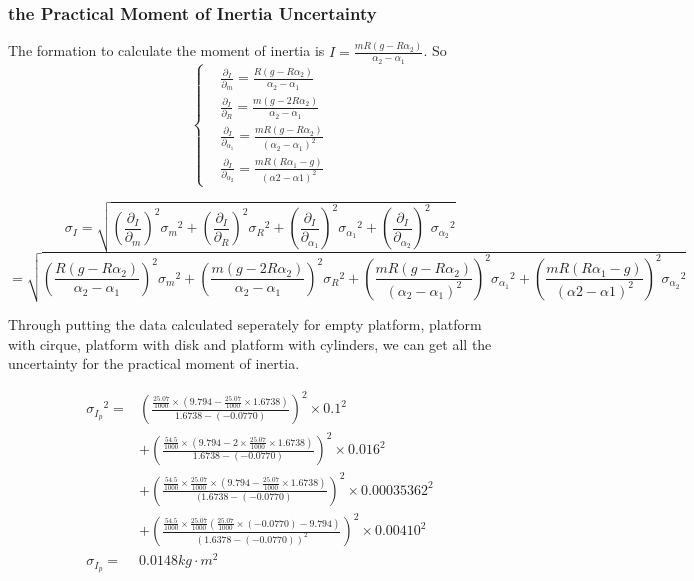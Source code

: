 \documentclass[12pt,a4paper]{article}
\begin{document}
\subsubsection{the Practical Moment of Inertia Uncertainty}
The formation to calculate the moment of inertia is $I=\frac{mR(g-R\alpha_2)}{\alpha_2-\alpha_1}$. So 
$$
\left\{
\begin{aligned}
    &\frac{\partial_I}{\partial_m}=\frac{R(g-R\alpha_2)}{\alpha_2-\alpha_1}\\
    &\frac{\partial_I}{\partial_R}=\frac{m(g-2R\alpha_2)}{\alpha_2-\alpha_1}\\
    &\frac{\partial_I}{\partial_{\alpha_1}}=\frac{mR(g-R\alpha_2)}{(\alpha_2-\alpha_1)^2}\\
    &\frac{\partial_I}{\partial_{\alpha_2}}=\frac{mR(R\alpha_1-g)}{(\alpha2-\alpha1)^2}
\end{aligned}
\right.
$$

$$\sigma_I=\sqrt{(\frac{\partial_I}{\partial_m})^2{\sigma_m}^2+(\frac{\partial_I}{\partial_R})^2{\sigma_R}^2+(\frac{\partial_I}{\partial_{\alpha_1}})^2{\sigma_{\alpha_1}}^2+(\frac{\partial_I}{\partial_{\alpha_2}})^2{\sigma_{\alpha_2}}^2}$$
$$=\sqrt{(\frac{R(g-R\alpha_2)}{\alpha_2-\alpha_1})^2{\sigma_m}^2+(\frac{m(g-2R\alpha_2)}{\alpha_2-\alpha_1})^2{\sigma_R}^2+(\frac{mR(g-R\alpha_2)}{(\alpha_2-\alpha_1)^2})^2{\sigma_{\alpha_1}}^2+(\frac{mR(R\alpha_1-g)}{(\alpha2-\alpha1)^2})^2{\sigma_{\alpha_2}}^2}$$

Through putting the data calculated seperately for empty platform, platform with cirque, platform with disk and platform with cylinders, we can get all the uncertainty for the practical moment of inertia.

$$
\begin{aligned}
{\sigma_{I_p}}^2=&(\frac{\frac{25.07}{1000}\times(9.794-\frac{25.07}{1000}\times 1.6738)}{1.6738-(-0.0770)})^2\times{0.1}^2\\
&+(\frac{\frac{54.5}{1000}\times(9.794-2\times \frac{25.07}{1000}\times 1.6738)}{1.6738-(-0.0770)})^2\times{0.016}^2\\
&+(\frac{\frac{54.5}{1000}\times \frac{25.07}{1000}\times(9.794-\frac{25.07}{1000}\times 1.6738)}{(1.6738-(-0.0770)})^2\times{0.00035362}^2\\
&+(\frac{\frac{54.5}{1000}\times\frac{25.07}{1000}(\frac{25.07}{1000}\times(-0.0770)-9.794)}{(1.6378-(-0.0770))^2})^2\times{0.00410}^2\\
\sigma_{I_p}=&0.0148kg\cdot m^2
\end{aligned}
$$
\end{document}
